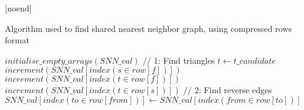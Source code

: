 \usepackage[]{algorithm}
\usepackage{algpseudocode}[noend]

\begin{algorithm}
\label{ag:snn2}
\caption{Algorithm used to find shared nearest neighbor graph, using compressed rows format}
\begin{algorithmic}[0]
    \State $initialise\_empty\_arrays(SNN\_val)$
    // 1: Find triangles
                    \State $t \gets t\_candidate$
                    \State $increment(SNN\_val[index(s \in row[f])])$
                    \State $increment(SNN\_val[index(t \in row[f])])$
                    \State $increment(SNN\_val[index(t \in row[s])])$
                \EndIf
            \EndFor
        \EndFor
    \EndFor
    // 2: Find reverse edges
            \State $SNN\_val[index(to \in row[from])] \gets SNN\_val[index(from \in row[to])]$
        \EndFor
    \EndFor
\EndProcedure
\end{algorithmic}
\end{algorithm}
